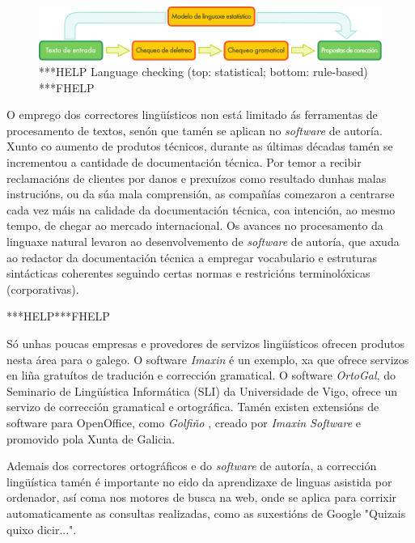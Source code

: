 \begin{multicols}{2}
 \begin{figure}[htb]
  \vspace{-9mm}
  \center
  \includegraphics[width=\textwidth]{../_media/galician/language_checking}
  \caption{***HELP Language checking (top: statistical; bottom: rule-based) ***FHELP}
  \label{fig:langcheckingaarch_ga}
\end{figure}

O emprego dos correctores lingüísticos non está limitado ás ferramentas de procesamento de textos, senón que tamén se aplican no \textit{software} de autoría. Xunto co aumento de produtos técnicos, durante as últimas décadas tamén se incrementou a cantidade de documentación técnica. Por temor a recibir reclamacións de clientes por danos e prexuízos como resultado dunhas malas instrucións, ou da súa mala comprensión, as compañías comezaron a centrarse cada vez máis na calidade da documentación técnica, coa intención, ao mesmo tempo, de chegar ao mercado internacional. Os avances no procesamento da linguaxe natural levaron ao desenvolvemento de \textit{software} de autoría, que axuda ao redactor da documentación técnica a empregar vocabulario e estruturas sintácticas coherentes seguindo certas normas e restricións terminolóxicas (corporativas). 

***HELP***FHELP


Só unhas poucas empresas e provedores de servizos lingüísticos ofrecen produtos nesta área para o galego. O software \textit{Imaxin} \cite{GAL-Nota21}  é un exemplo, xa que ofrece servizos en liña gratuítos de tradución e corrección gramatical. O software \textit{OrtoGal}, do Seminario de Lingüística Informática (SLI) \cite{GAL-Nota22} da Universidade de Vigo, ofrece un servizo de corrección gramatical e ortográfica. Tamén existen extensións de software para OpenOffice, como \textit{Golfiño} \cite{GAL-Nota23}, creado por \textit{Imaxin Software} e promovido pola Xunta de Galicia.

Ademais dos correctores ortográficos e do \textit{software} de autoría, a corrección lingüística tamén é importante no eido da aprendizaxe de linguas asistida por ordenador, así coma nos motores de busca na web, onde se aplica para corrixir automaticamente as consultas realizadas, como as suxestións de Google "Quizais quixo dicir...". 



\end{multicols}
